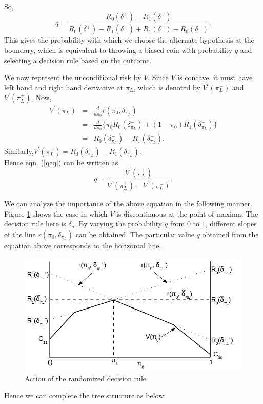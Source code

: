 \documentclass[12pt]{report}
\begin{document}
So,
\begin{equation}
\label{qeq}
q = \frac{R_0(\delta^{+}) - R_1(\delta^{+})}{R_0(\delta^{+}) - R_1(\delta^{+}) + R_1(\delta^{-}) - R_0(\delta^{-})}.
\end{equation}
This gives the probability with which we choose the alternate hypothesis at the boundary, which is equivalent to throwing a biased coin with probability $q$ and
selecting a decision rule based on the outcome.
\begin{rem}
We now represent the unconditional risk by $V$. Since $V$ is concave, it must have left hand and right hand derivative at $\pi_L$, which is denoted by $V^{'}(\pi_L^{-})$ and $V^{'}(\pi_L^{+})$. Now,
\begin{eqnarray}
V^{'}(\pi_L^{-}) &=& \frac{d}{d \pi_0} r(\pi_0 , \delta_{\pi_L}^{-})\nonumber \\
&=& \frac{d}{d\pi_0}\{\pi_0 R_0(\delta_{\pi_L}^{-}) + (1-\pi_0)R_1(\delta_{\pi_L}^{-}) \}\nonumber \\
&=& R_0(\delta_{\pi_L}^{-}) - R_1(\delta_{\pi_L}^{-}). 
\end{eqnarray}
Similarly,\hspace{2.5cm}$V^{'}(\pi_L^{+}) = R_0(\delta_{\pi_L}^{+}) - R_1(\delta_{\pi_L}^{+})$. \\Hence eqn. (\ref{qeq}) can be written as
\begin{equation}
q = \frac{V^{'}(\pi_L^{+})}{V^{'}(\pi_L^{+}) - V^{'}(\pi_L^{-})}.
\end{equation}
\end{rem}
We can analyze the importance of the above equation in the following manner. Figure \ref{fig:DecisionRules} shows the case in which $V$ is discontinuous at the point of maxima. The decision rule here is ${{ \delta}_{q}}$. By varying the probability $q$ from $0$ to $1$, different slopes of the line $r(\pi_0, {{\delta}_{\pi_L}})$ can be obtained. The particular value $q$ obtained from the equation above corresponds to the horizontal line.   
\begin{figure}[h]
\centering
\includegraphics[width=0.7\linewidth]{Figures/Lec4_Fig3.jpg}
\caption[rdr]{Action of the randomized decision rule}
\label{fig:DecisionRules}
\end{figure}
\newpage
\noindent Hence we can complete the tree structure as below:\\
\end{document}
